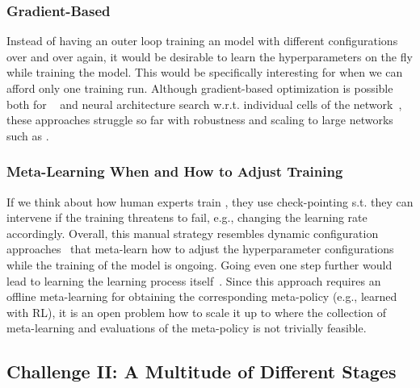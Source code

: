 \documentclass[10pt]{article} %
\begin{document}
\subsubsection{Gradient-Based \AutoML}

Instead of having an outer loop training an \ML model with different configurations over and over again, it would be desirable to learn the hyperparameters on the fly while training the \ML model. This would be specifically interesting for \LLMs when we can afford only one training run. Although gradient-based optimization is possible both for \HPO~\citep{maclaurin-icml15a,luketina-icml16a,franceschi-icml17a,mackay-iclr19a,lorraine-aistats20a} and neural architecture search w.r.t. individual cells of the network~\citep{liu-iclr19a,elsken-jmlr19a}, these approaches struggle so far with robustness and scaling to large networks such as \LLMs.

\subsubsection{Meta-Learning When and How to Adjust Training}

If we think about how human experts train \LLMs, they use check-pointing s.t. they can intervene if the training threatens to fail, e.g., changing the learning rate accordingly. Overall, this manual strategy resembles dynamic configuration approaches~\citep{adriaensen-jair22a} that meta-learn how to adjust the hyperparameter configurations while the training of the model is ongoing. 
Going even one step further would lead to learning the learning process itself~\citep{andrychowicz-neurips16a,chen-neurips22a}.
Since this approach requires an offline meta-learning for obtaining the corresponding meta-policy (e.g., learned with RL), it is an open problem how to scale it up to \LLMs where the collection of meta-learning and evaluations of the meta-policy is not trivially feasible.


\subsection{Challenge II: A Multitude of Different Stages}
\end{document}

